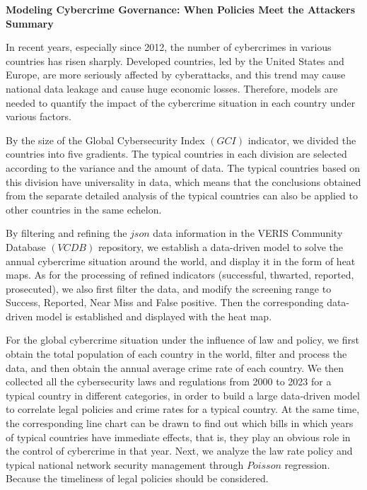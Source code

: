 \documentclass[12pt]{article}
\begin{document}
\begin{center}
	\fontsize{16}{19}\selectfont \textbf{Modeling Cybercrime Governance: When Policies Meet the Attackers} \\
	\bigskip
	\fontsize{16}{19}\selectfont \textbf{Summary} \\
\end{center}
\begin{adjustwidth}{2em}{2em}
	\hspace*{1.5em} In recent years, especially since 2012, the number of cybercrimes in various countries has risen sharply.
	Developed countries, led by the United States and Europe, are more seriously affected by cyberattacks,
	and this trend may cause national data leakage and cause huge economic losses.
	Therefore, models are needed to quantify the impact of the cybercrime situation in each country under various factors.

	By the size of the Global Cybersecurity Index $(GCI)$ indicator, we divided the countries into five gradients.
	The typical countries in each division are selected according to the variance and the amount of data.
	The typical countries based on this division have universality in data,
	which means that the conclusions obtained from the separate detailed analysis of the typical countries can also be applied to other countries in the same echelon.

	By filtering and refining the $json$ data information in the VERIS Community Database $(VCDB)$ repository,
	we establish a data-driven model to solve the annual cybercrime situation around the world, and display it in the form of heat maps.
	As for the processing of refined indicators (successful, thwarted, reported, prosecuted),
	we also first filter the data, and modify the screening range to Success, Reported, Near Miss and False positive.
	Then the corresponding data-driven model is established and displayed with the heat map.

	For the global cybercrime situation under the influence of law and policy,
	we first obtain the total population of each country in the world, filter and process the data, and then obtain the annual average crime rate of each country.
	We then collected all the cybersecurity laws and regulations from 2000 to 2023 for a typical country in different categories,
	in order to build a large data-driven model to correlate legal policies and crime rates for a typical country.
	At the same time, the corresponding line chart can be drawn to find out which bills in which years of typical countries have immediate effects,
	that is, they play an obvious role in the control of cybercrime in that year.
	Next, we analyze the law rate policy and typical national network security management through $Poisson$ regression.
	Because the timeliness of legal policies should be considered.


\end{adjustwidth}
\end{document}
